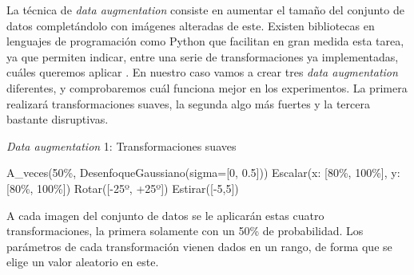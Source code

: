 La técnica de \textit{data augmentation} consiste en aumentar el tamaño del conjunto de datos completándolo con imágenes alteradas de este. Existen bibliotecas en lenguajes de programación como Python que facilitan en gran medida esta tarea, ya que permiten indicar, entre una serie de transformaciones ya implementadas, cuáles queremos aplicar \cite{imgaug}. En nuestro caso vamos a crear tres \textit{data augmentation} diferentes, y comprobaremos cuál funciona mejor en los experimentos. La primera realizará transformaciones suaves, la segunda algo más fuertes y la tercera bastante disruptivas.

\begin{algorithm}[H]
    \caption{\textit{Data augmentation} 1: Transformaciones suaves}
\begin{algorithmic}[1]
    \State A\_veces(50\%, DesenfoqueGaussiano(sigma=[0, 0.5]))
    \State Escalar(x: [80\%, 100\%], y: [80\%, 100\%])
    \State Rotar([-25º, +25º])
    \State Estirar([-5,5])
\end{algorithmic}
\end{algorithm}

A cada imagen del conjunto de datos se le aplicarán estas cuatro transformaciones, la primera solamente con un 50\% de probabilidad. Los parámetros de cada transformación vienen dados en un rango, de forma que se elige un valor aleatorio en este.

